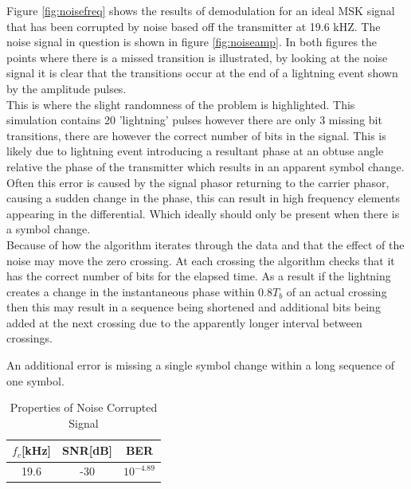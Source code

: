 Figure \ref{fig:noisefreq} shows the results of demodulation for an ideal MSK signal that has been corrupted by noise based off the transmitter at 19.6 kHZ. The noise signal in question is shown in figure \ref{fig:noiseamp}. In both figures the points where there is a missed transition is illustrated, by looking at the noise signal it is clear that the transitions occur at the end of a lightning event shown by the amplitude pulses. 
\\
This is where the slight randomness of the problem is highlighted. This simulation contains 20 'lightning' pulses however there are only 3 missing bit transitions, there are however the correct number of bits in the signal. This is likely due to lightning event introducing a resultant phase at an obtuse angle relative the phase of the transmitter which results in an apparent symbol change. Often this error is caused by the signal phasor returning to the carrier phasor, causing a sudden change in the phase, this can result in high frequency elements appearing in the differential. Which ideally should only be present when there is a symbol change.  
\\
Because of how the algorithm iterates through the data and that the effect of the noise may move the zero crossing. At each crossing the algorithm checks that it has the correct number of bits for the elapsed time. As a result if the lightning creates a change in the instantaneous phase within $0.8T_b$ of an actual crossing then this may result in a sequence being shortened and additional bits being added at the next crossing due to the apparently longer interval between crossings. 

An additional error is missing a single symbol change within a long sequence of one symbol.

\begin{table}[h!]
    \centering
    \begin{tabular}{c|c|c}
        $f_c$[kHz]&SNR[dB] & BER \\
        \hline
        19.6 &-30 & $10^{-4.89}$
    \end{tabular}
    \caption{Properties of Noise Corrupted Signal}
    \label{tab:simProp}
\end{table}

